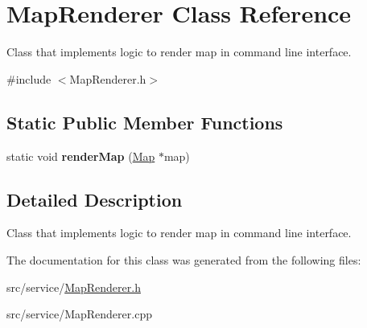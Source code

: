 \hypertarget{classMapRenderer}{}\section{Map\+Renderer Class Reference}
\label{classMapRenderer}


Class that implements logic to render map in command line interface.  




{\ttfamily \#include $<$Map\+Renderer.\+h$>$}

\subsection*{Static Public Member Functions}
\begin{DoxyCompactItemize}
\item 
\hypertarget{classMapRenderer_aeab26a37fb16b48315e77a6591751c94}{}\label{classMapRenderer_aeab26a37fb16b48315e77a6591751c94} 
static void {\bfseries render\+Map} (\hyperlink{classMap}{Map} $\ast$map)
\end{DoxyCompactItemize}


\subsection{Detailed Description}
Class that implements logic to render map in command line interface. 

The documentation for this class was generated from the following files\+:\begin{DoxyCompactItemize}
\item 
src/service/\hyperlink{MapRenderer_8h}{Map\+Renderer.\+h}\item 
src/service/Map\+Renderer.\+cpp\end{DoxyCompactItemize}
